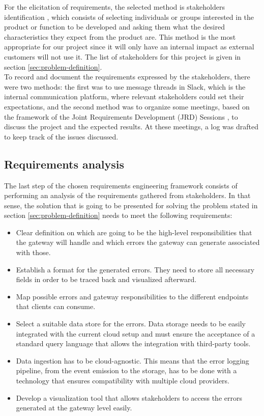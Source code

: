 \documentclass[english, 12pt, a4paper, sci, utf8, a-1b, online]{aaltothesis}
\begin{document}
For the elicitation of requirements, the selected method is stakeholders identification \cite{mitchell1997toward}, which consists of selecting individuals or groups interested in the product or function to be developed and asking them what the desired characteristics they expect from the product are. This method is the most appropriate for our project since it will only have an internal impact as external customers will not use it. The list of stakeholders for this project is given in section \ref{sec:problem-definition}.\\

To record and document the requirements expressed by the stakeholders, there were two methods: the first was to use message threads in Slack, which is the internal communication platform, where relevant stakeholders could set their expectations, and the second method was to organize some meetings, based on the framework of the Joint Requirements Development (JRD) Sessions \cite{hay2003requirements}, to discuss the project and the expected results. At these meetings, a log was drafted to keep track of the issues discussed.

\subsection{Requirements analysis}
\label{sec:req-analysis}

The last step of the chosen requirements engineering framework consists of performing an analysis of the requirements gathered from stakeholders. In that sense, the solution that is going to be presented for solving the problem stated in section \ref{sec:problem-definition} needs to meet the following requirements:

\begin{itemize}
    \item Clear definition on which are going to be the high-level responsibilities that the gateway will handle and which errors the gateway can generate associated with those.
    \item Establish a format for the generated errors. They need to store all necessary fields in order to be traced back and visualized afterward.
    \item Map possible errors and gateway responsibilities to the different endpoints that clients can consume.
    \item Select a suitable data store for the errors. Data storage needs to be easily integrated with the current cloud setup and must ensure the acceptance of a standard query language that allows the integration with third-party tools.
    \item Data ingestion has to be cloud-agnostic. This means that the error logging pipeline, from the event emission to the storage, has to be done with a technology that ensures compatibility with multiple cloud providers.
    \item Develop a visualization tool that allows stakeholders to access the errors generated at the gateway level easily.
\end{itemize}
\end{document}
